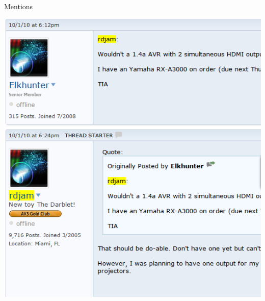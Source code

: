 \documentclass[12pt]{presentation}
\begin{document}
\begin{frame}{Mentions}
	\begin{center}
		\includegraphics[scale=0.4]{screenshots/replies.png}\\
	\end{center}
\end{frame}
\end{document}
